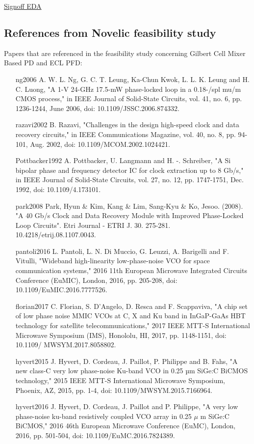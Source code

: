 \documentclass{article}
\begin{document}
\href{https://en.wikipedia.org/wiki/Signoff_(electronic_design_automation)}{Signoff EDA}

\subsection{References from Novelic feasibility study}

Papers that are referenced in the feasibility study concerning Gilbert Cell Mixer Based PD and ECL PFD:

\begin{itemize}

	\item [ng2006] A. W. L. Ng, G. C. T. Leung, Ka-Chun Kwok, L. L. K. Leung and H. C. Luong, "A 1-V 24-GHz 17.5-mW phase-locked loop in a 0.18-/spl mu/m CMOS process," in IEEE Journal of	Solid-State Circuits, vol. 41, no. 6, pp. 1236-1244, June 2006, doi: 10.1109/JSSC.2006.874332.
	\item [razavi2002] B. Razavi, "Challenges in the design high-speed clock and data recovery circuits," in IEEE Communications Magazine, vol. 40, no. 8, pp. 94-101, Aug. 2002, doi: 10.1109/MCOM.2002.1024421.
	\item [Pottbacker1992] A. Pottbacker, U. Langmann and H. -. Schreiber, "A Si bipolar phase and frequency detector IC for clock extraction up to 8 Gb/s," in IEEE Journal of Solid-State Circuits, vol. 27, no. 12, pp. 1747-1751, Dec. 1992, doi: 10.1109/4.173101. 
	\item [park2008] Park, Hyun \& Kim, Kang \& Lim, Sang-Kyu \& Ko, Jesoo. (2008). "A 40 Gb/s Clock and Data Recovery Module with Improved Phase-Locked Loop Circuits". Etri Journal - ETRI J. 30. 275-281. 10.4218/etrij.08.1107.0043.
	\item [pantoli2016] L. Pantoli, L. N. Di Muccio, G. Leuzzi, A. Barigelli and F. Vitulli, "Wideband high-linearity low-phase-noise VCO for space communication systems," 2016 11th European Microwave Integrated Circuits Conference (EuMIC), London, 2016, pp. 205-208, doi: 10.1109/EuMIC.2016.7777526.
	\item [florian2017] C. Florian, S. D'Angelo, D. Resca and F. Scappaviva, "A chip set of low phase noise MMIC VCOs at C, X and Ku band in InGaP-GaAs HBT technology for satellite telecommunications," 2017 IEEE MTT-S International Microwave Symposium (IMS), Honololu, HI, 2017, pp. 1148-1151, doi: 10.1109/ MWSYM.2017.8058802.
	\item [hyvert2015] J. Hyvert, D. Cordeau, J. Paillot, P. Philippe and B. Fahs, "A new class-C very low phase-noise Ku-band VCO in 0.25 µm SiGe:C BiCMOS technology," 2015 IEEE MTT-S International Microwave Symposium, Phoenix, AZ, 2015, pp. 1-4, doi: 10.1109/MWSYM.2015.7166964.
	\item [hyvert2016] J. Hyvert, D. Cordeau, J. Paillot and P. Philippe, "A very low phase-noise ku-band resistively coupled VCO array in 0.25 $\mu$ m SiGe:C BiCMOS," 2016 46th European Microwave Conference (EuMC), London, 2016, pp. 501-504, doi: 10.1109/EuMC.2016.7824389.


\end{itemize}
\end{document}
